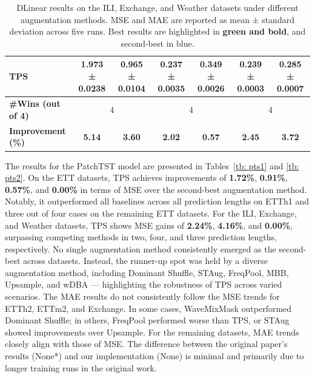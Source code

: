 \begin{table}[h!]
\begin{adjustbox}{max width=\textwidth}
\begin{tabular}{l|cc|cc|cc}
    TPS          & \cellcolor{bestcolor}\textbf{1.973 ± 0.0238} & \cellcolor{bestcolor}\textbf{0.965 ± 0.0104} & \cellcolor{bestcolor}\textbf{0.237 ± 0.0035} & \cellcolor{bestcolor}\textbf{0.349 ± 0.0026} & \cellcolor{bestcolor}\textbf{0.239 ± 0.0003} & \cellcolor{bestcolor}\textbf{0.285 ± 0.0007} \\
    \midrule
    \textbf{\#Wins (out of 4)} & \multicolumn{2}{c|}{4} & \multicolumn{2}{c|}{4} & \multicolumn{2}{c}{4} \\
    \textbf{Improvement (\%)} & \cellcolor{bestcolor} \textbf{5.14} & \cellcolor{bestcolor} \textbf{3.60} & \cellcolor{bestcolor} \textbf{2.02} & \cellcolor{bestcolor} \textbf{0.57} & \cellcolor{bestcolor} \textbf{2.45} & \cellcolor{bestcolor} \textbf{3.72} \\
    \bottomrule
\end{tabular}
\end{adjustbox}
\caption{DLinear results on the ILI, Exchange, and Weather datasets under different augmentation methods. MSE and MAE are reported as mean ± standard deviation across five runs. Best results are highlighted in \textbf{green and bold}, and second-best in blue.}
\label{tb: dl2}
\end{table}





The results for the PatchTST model are presented in Tables~\ref{tb: pts1} and \ref{tb: pts2}. On the ETT datasets, TPS achieves improvements of \textbf{1.72\%}, \textbf{0.91\%}, \textbf{0.57\%}, and \textbf{0.00\%} in terms of MSE over the second-best augmentation method. Notably, it outperformed all baselines across all prediction lengths on ETTh1 and three out of four cases on the remaining ETT datasets. For the ILI, Exchange, and Weather datasets, TPS shows MSE gains of \textbf{2.24\%}, \textbf{4.16\%}, and \textbf{0.00\%}, surpassing competing methods in two, four, and three prediction lengths, respectively. No single augmentation method consistently emerged as the second-best across datasets. Instead, the runner-up spot was held by a diverse augmentation method, including Dominant Shuffle, STAug, FreqPool, MBB, Upsample, and wDBA — highlighting the robustness of TPS across varied scenarios. The MAE results do not consistently follow the MSE trends for ETTh2, ETTm2, and Exchange. In some cases, WaveMixMask outperformed Dominant Shuffle; in others, FreqPool performed worse than TPS, or STAug showed improvements over Upsample. For the remaining datasets, MAE trends closely align with those of MSE. The difference between the original paper's results (None*) and our implementation (None) is minimal and primarily due to longer training runs in the original work.



